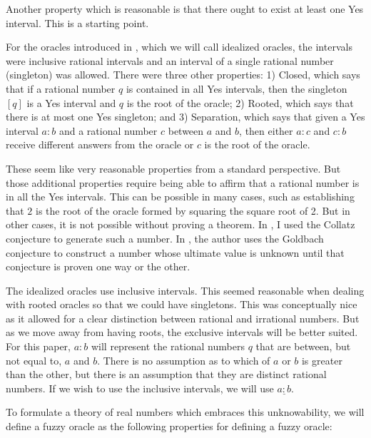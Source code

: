 \documentclass[12pt]{article}
\begin{document}
Another property which is reasonable is that there ought to exist at least one Yes interval. This is a starting point. 

For the oracles introduced in \cite{taylor23main}, which we will call idealized oracles, the intervals were inclusive rational intervals and an interval of a single rational number (singleton) was allowed.  There were three other properties: 1) Closed, which says that if a rational number $q$ is contained in all Yes intervals, then the singleton $[q]$ is a Yes interval and $q$ is the root of the oracle; 2) Rooted, which says that there is at most one Yes singleton; and 3) Separation, which says that given a Yes interval $a:b$ and a rational number $c$ between $a$ and $b$, then either $a:c$ and $c:b$ receive different answers from the oracle or $c$ is the root of the oracle.  

These seem like very reasonable properties from a standard perspective. But those additional properties require being able to affirm that a rational number is in all the Yes intervals. This can be possible in many cases, such as establishing that $2$ is the root of the oracle formed by squaring the square root of 2. But in other cases, it is not possible without proving a theorem. In \cite{taylor23main}, I used the Collatz conjecture to generate such a number. In \cite{bridger}, the author uses the Goldbach conjecture to construct a number whose ultimate value is unknown until that conjecture is proven one way or the other. 

The idealized oracles use inclusive intervals. This seemed reasonable when dealing with rooted oracles so that we could have singletons. This was conceptually nice as it allowed for a clear distinction between rational and irrational numbers. But as we move away from having roots, the exclusive intervals will be better suited. For this paper, $a:b$ will represent the rational numbers $q$ that are between, but not equal to, $a$ and $b$. There is no assumption as to which of $a$ or $b$ is greater than the other, but there is an assumption that they are distinct rational numbers. If we wish to use the inclusive intervals, we will use $\underline{a:b}$. 

To formulate a theory of real numbers which embraces this unknowability, we will define a fuzzy oracle as the following properties for defining a fuzzy oracle: 
\end{document}

